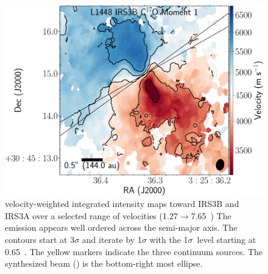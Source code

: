 \begin{figure}[H]
\begin{center}
   \includegraphics[width=1\textwidth]{img/L1448IRS3B_C17O_image_taper1500k_image_M1_fits.pdf}  %
\end{center}
   \caption{\cso\space velocity-weighted integrated intensity maps toward IRS3B and IRS3A over a selected range of velocities (1.27$\rightarrow$7.65~\kms) The \cso\space emission appears well ordered across the semi-major axis. The contours start at 3$\sigma$ and iterate by 1$\sigma$ with the 1$\sigma$~level starting at 0.65~\kms. The yellow markers indicate the three continuum sources.  The \cso\space synthesized beam (\csobeam) is the bottom-right most ellipse.}\label{fig:irs3abc17omoment1}
\end{figure}


